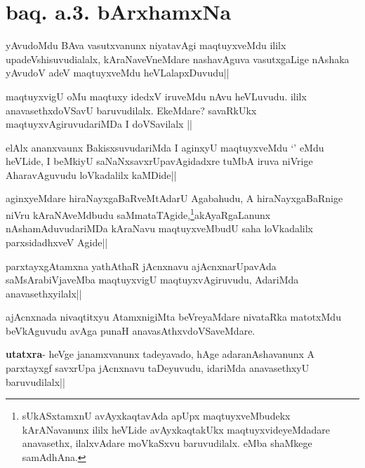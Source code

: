\section*{baq. a.3. bArxhamxNa}


\begin{artha}
yAvudoMdu BAva vasutxvanunx niyatavAgi maqtuyxveMdu ililx upadeVshisuvudialalx, 
kAraNaveVneMdare nashavAguva vasutxgaLige nAshaka yAvudoV adeV maqtuyxveMdu heVLalapxDuvudu||
\end{artha}


\begin{artha}
maqtuyxvigU oMu maqtuxy idedxV iruveMdu nAvu heVLuvudu. ililx anavasethxdoVSavU 
baruvudilalx. EkeMdare? savaRkUkx maqtuyxvAgiruvudariMDa I doVSavilalx ||
\end{artha}

\begin{artha}
elAlx ananxvaunx BakisxsuvudariMda I aginxyU maqtuyxveMdu `\stext'  eMdu heVLide, I 
beMkiyU saNaNxsavxrUpavAgidadxre tuMbA iruva niVrige AharavAguvudu loVkadalilx kaMDide||
\end{artha}


\begin{artha}
aginxyeMdare hiraNayxgaBaRveMtAdarU Agabahudu, A hiraNayxgaBaRnige niVru kAraNAveMdbudu 
saMmataTAgide,\footnote{sUkASxtamxnU avAyxkaqtavAda apUpx maqtuyxveMbudekx kArANavanunx  
ililx heVLide avAyxkaqtakUkx maqtuyxvideyeMdadare anavasethx, ilalxvAdare moVkaSxvu 
baruvudilalx. eMba shaMkege samAdhAna.}akAyaRgaLanunx nAshamAduvudariMDa kAraNavu 
maqtuyxveMbudU saha loVkadalilx 
parxsidadhxveV Agide||
\end{artha}

\begin{artha}
parxtayxgAtamxna yathAthaR jAcnxnavu ajAcnxnarUpavAda saMsArabiVjaveMba maqtuyxvigU maqtuyxvAgiruvudu, AdariMda anavasethxyilalx||
\end{artha}

\begin{artha}
ajAcnxnada nivaqtitxyu AtamxnigiMta beVreyaMdare nivataRka matotxMdu beVkAguvudu avAga 
punaH anavasAthxvdoVSaveMdare.

\textbf{utatxra}- heVge janamxvanunx tadeyavado, hAge adaranAshavanunx A parxtayxgf 
savxrUpa jAcnxnavu taDeyuvudu, idariMda anavasethxyU baruvudilalx||
\end{artha}

